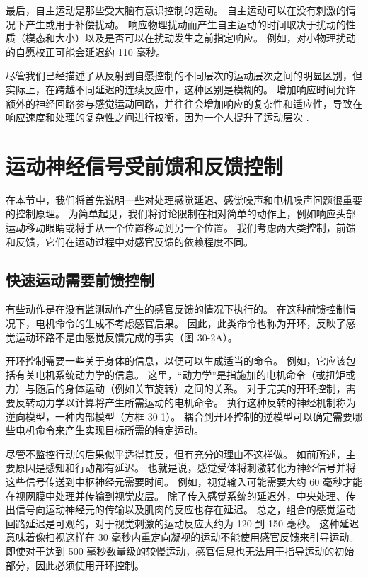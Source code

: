 最后，自主运动是那些受大脑有意识控制的运动。 自主运动可以在没有刺激的情况下产生或用于补偿扰动。 响应物理扰动而产生自主运动的时间取决于扰动的性质（模态和大小）以及是否可以在扰动发生之前指定响应。 例如，对小物理扰动的自愿校正可能会延迟约 110 毫秒。

尽管我们已经描述了从反射到自愿控制的不同层次的运动层次之间的明显区别，但实际上，在跨越不同延迟的连续反应中，这种区别是模糊的。 增加响应时间允许额外的神经回路参与感觉运动回路，并往往会增加响应的复杂性和适应性，导致在响应速度和处理的复杂性之间进行权衡，因为一个人提升了运动层次 .


\section{运动神经信号受前馈和反馈控制}
在本节中，我们将首先说明一些对处理感觉延迟、感觉噪声和电机噪声问题很重要的控制原理。 为简单起见，我们将讨论限制在相对简单的动作上，例如响应头部运动移动眼睛或将手从一个位置移动到另一个位置。 我们考虑两大类控制，前馈和反馈，它们在运动过程中对感官反馈的依赖程度不同。


\subsection{快速运动需要前馈控制}

有些动作是在没有监测动作产生的感官反馈的情况下执行的。 在这种前馈控制情况下，电机命令的生成不考虑感官后果。 因此，此类命令也称为开环，反映了感觉运动环路不是由感觉反馈完成的事实（图 30-2A）。

开环控制需要一些关于身体的信息，以便可以生成适当的命令。 例如，它应该包括有关电机系统动力学的信息。 这里，“动力学”是指施加的电机命令（或扭矩或力）与随后的身体运动（例如关节旋转）之间的关系。 对于完美的开环控制，需要反转动力学以计算将产生所需运动的电机命令。 执行这种反转的神经机制称为逆向模型，一种内部模型（方框 30-1）。 耦合到开环控制的逆模型可以确定需要哪些电机命令来产生实现目标所需的特定运动。

尽管不监控行动的后果似乎适得其反，但有充分的理由不这样做。 如前所述，主要原因是感知和行动都有延迟。 也就是说，感觉受体将刺激转化为神经信号并将这些信号传送到中枢神经元需要时间。 例如，视觉输入可能需要大约 60 毫秒才能在视网膜中处理并传输到视觉皮层。 除了传入感觉系统的延迟外，中央处理、传出信号向运动神经元的传输以及肌肉的反应也存在延迟。 总之，组合的感觉运动回路延迟是可观的，对于视觉刺激的运动反应大约为 120 到 150 毫秒。 这种延迟意味着像扫视这样在 30 毫秒内重定向凝视的运动不能使用感官反馈来引导运动。 即使对于达到 500 毫秒数量级的较慢运动，感官信息也无法用于指导运动的初始部分，因此必须使用开环控制。

